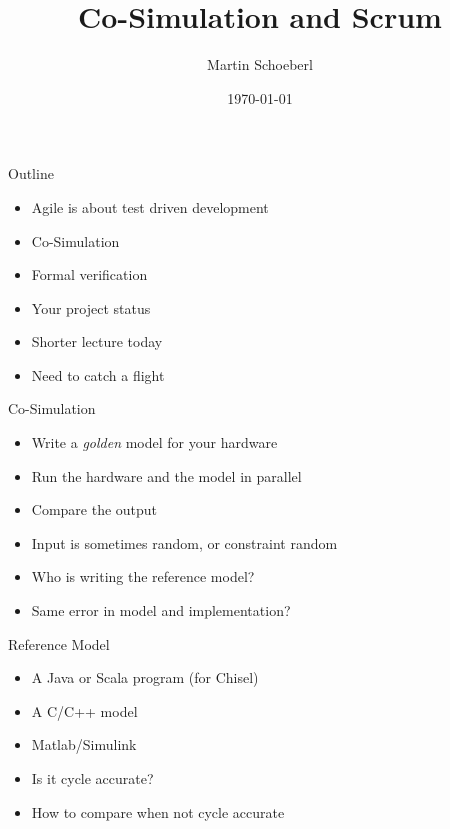 

\newif\ifbook


\usepackage{tikz}
\usetikzlibrary{positioning, arrows.meta}


\title{Co-Simulation and Scrum}
\author{Martin Schoeberl}
\date{\today}



\begin{frame}
\titlepage
\end{frame}




\begin{frame}[fragile]{Outline}
\begin{itemize}
\item Agile is about test driven development
\item Co-Simulation
\item Formal verification
\item Your project status
\item Shorter lecture today
\item Need to catch a flight
\end{itemize}
\end{frame}

\begin{frame}[fragile]{Co-Simulation}
\begin{itemize}
\item Write a \emph{golden} model for your hardware
\item Run the hardware and the model in parallel
\item Compare the output
\item Input is sometimes random, or constraint random
\item Who is writing the reference model?
\item Same error in model and implementation?
\end{itemize}
\end{frame}

\begin{frame}[fragile]{Reference Model}
\begin{itemize}
\item A Java or Scala program (for Chisel)
\item A C/C++ model
\item Matlab/Simulink
\item Is it cycle accurate?
\item How to compare when not cycle accurate
\end{itemize}
\end{frame}

